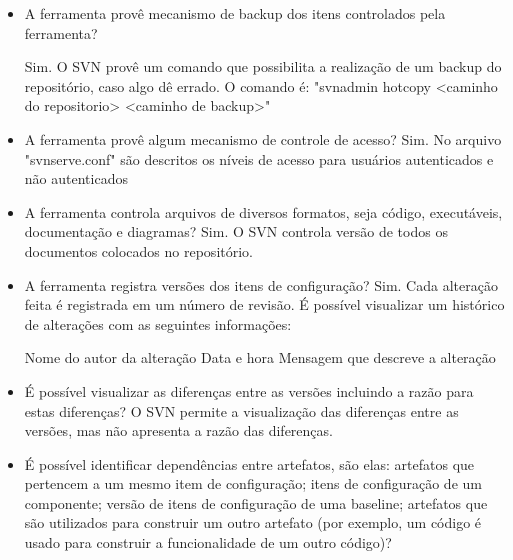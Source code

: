 \begin{itemize}
  \item A ferramenta provê mecanismo de backup dos itens controlados pela ferramenta?

    Sim. O SVN provê um comando que possibilita a realização de um backup do repositório, caso algo dê errado. O comando é:
    "svnadmin hotcopy <caminho do repositorio> <caminho de backup>"

  \item A ferramenta provê algum mecanismo de controle de acesso?
    Sim. No arquivo "svnserve.conf" são descritos os níveis de acesso para usuários autenticados e não autenticados

  \item A ferramenta controla arquivos de diversos formatos, seja código, executáveis, documentação e diagramas?
    Sim. O SVN controla versão de todos os documentos colocados no repositório.

  \item A ferramenta registra versões dos itens de configuração?
    Sim. Cada alteração feita é registrada em um número de revisão. É possível visualizar um histórico de alterações com as seguintes informações:

    \subitem Nome do autor da alteração
    \subitem Data e hora
    \subitem Mensagem que descreve a alteração

  \item É possível visualizar as diferenças entre as versões incluindo a razão para estas 
  diferenças?
  O SVN permite a visualização das diferenças entre as versões, mas não apresenta a razão das diferenças.
  
  \item É possível identificar dependências entre artefatos, são elas: artefatos que pertencem a um mesmo item de configuração; itens de configuração de um componente; versão de itens de configuração de uma baseline; artefatos que são utilizados para construir um outro artefato  (por exemplo, um código é usado para construir a funcionalidade de um outro código)?
  

\end{itemize}
